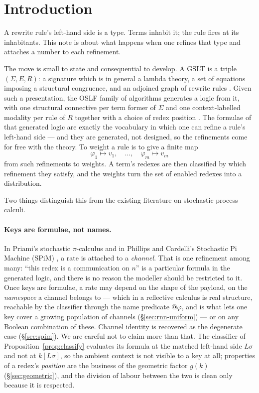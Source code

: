 \documentclass[11pt,a4paper]{article}
\theoremstyle{plain}
\theoremstyle{definition}
\theoremstyle{remark}
\newcommand{\gfac}{g}
\begin{document}
\tableofcontents

\section{Introduction}
\label{sec:intro}

A rewrite rule's left-hand side is a type. Terms inhabit it; the rule fires at its inhabitants. This
note is about what happens when one refines that type and attaches a number to each refinement.

The move is small to state and consequential to develop. A GSLT is a triple $(\Sigma, E, R)$: a
signature which is in general a lambda theory, a set of equations imposing a structural congruence,
and an adjoined graph of rewrite rules \cite{omnibus}. Given such a presentation, the OSLF family of
algorithms generates a logic from it, with one structural connective per term former of $\Sigma$ and
one context-labelled modality per rule of $R$ together with a choice of redex position
\cite{omnibus,classifier}. The formulae of that generated logic are exactly the vocabulary in which
one can refine a rule's left-hand side --- and they are generated, not designed, so the refinements
come for free with the theory. To weight a rule is to give a finite map
\[
\varphi_1 \mapsto v_1, \quad \ldots, \quad \varphi_m \mapsto v_m
\]
from such refinements to weights. A term's redexes are then classified by which refinement they
satisfy, and the weights turn the set of enabled redexes into a distribution.

Two things distinguish this from the existing literature on stochastic process calculi.

\paragraph{Keys are formulae, not names.} In Priami's stochastic $\pi$-calculus \cite{priami} and in
Phillips and Cardelli's Stochastic Pi Machine (SPiM) \cite{spim,spim-sim}, a rate is attached to a
\emph{channel}. That is one refinement among many: ``this redex is a communication on $n$'' is a
particular formula in the generated logic, and there is no reason the modeller should be restricted
to it. Once keys are formulae, a rate may depend on the shape of the payload, on the \emph{namespace}
a channel belongs to --- which in a reflective calculus is real structure, reachable by the classifier
through the name predicate $@\varphi$, and is what lets one key cover a growing population of
channels (\S\ref{sec:rnn-uniform}) --- or on any Boolean combination of these. Channel identity is
recovered as the degenerate case (\S\ref{sec:spim}). We are careful not to claim more than that. The
classifier of Proposition~\ref{prop:classify} evaluates its formula at the matched left-hand side
$L\sigma$ and not at $k[L\sigma]$, so the ambient context is not visible to a key at all; properties
of a redex's \emph{position} are the business of the geometric factor $\gfac(k)$ (\S\ref{sec:geometric}),
and the division of labour between the two is clean only because it is respected.
\end{document}
